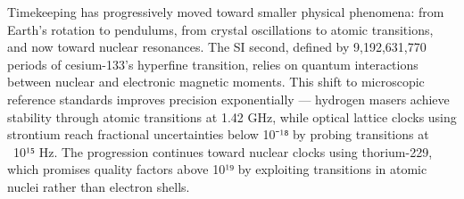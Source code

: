 Timekeeping has progressively moved toward smaller physical phenomena: from Earth's rotation to pendulums, from crystal oscillations to atomic transitions, and now toward nuclear resonances. The SI second, defined by 9,192,631,770 periods of cesium-133's hyperfine transition, relies on quantum interactions between nuclear and electronic magnetic moments. This shift to microscopic reference standards improves precision exponentially — hydrogen masers achieve stability through atomic transitions at 1.42 GHz, while optical lattice clocks using strontium reach fractional uncertainties below 10⁻¹⁸ by probing transitions at ~10¹⁵ Hz. The progression continues toward nuclear clocks using thorium-229, which promises quality factors above 10¹⁹ by exploiting transitions in atomic nuclei rather than electron shells.